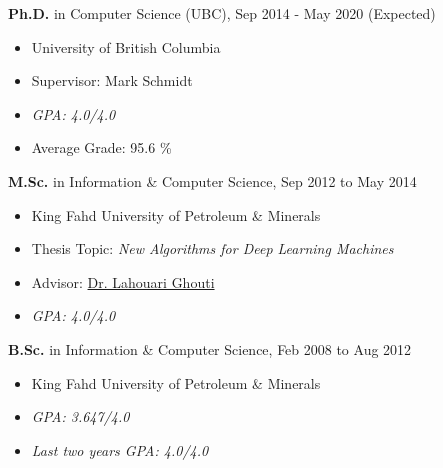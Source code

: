 \documentclass[10pt]{article}
\newenvironment{innerlist}[1][\enskip\textbullet]%
        {\begin{itemize}[#1,leftmargin=*,parsep=0pt,itemsep=0pt,topsep=0pt,partopsep=0pt]}
        {\end{itemize}}
\begin{document}
{\bf Ph.D.} in Computer Science (UBC),  \hfill Sep 2014 - May 2020 (Expected)
             
        \begin{innerlist}
        \item University of British Columbia
        \item Supervisor: {Mark Schmidt}
        \item \emph{GPA: 4.0/4.0}
        \item Average Grade: 95.6 \%\\
        \end{innerlist}
 {\bf M.Sc.} in Information \& Computer Science, \hfill {Sep 2012 to May 2014}
        
       \begin{innerlist}
        \item King Fahd University of Petroleum \& Minerals
        \item Thesis Topic: \emph{New Algorithms for Deep Learning Machines}
        \item Advisor:
              \href{http://faculty.kfupm.edu.sa/ICS/lahouari/Default.htm}
                   {Dr. Lahouari Ghouti}
        \item \emph{GPA: 4.0/4.0}\\
        \end{innerlist}

 {\bf B.Sc.} in Information \& Computer Science, \hfill {Feb 2008 to Aug 2012}
        \begin{innerlist}
        \item King Fahd University of Petroleum \& Minerals
        \item \emph{GPA: 3.647/4.0}
        \item \emph{Last two years GPA:  4.0/4.0}
        \end{innerlist}
\end{document}
